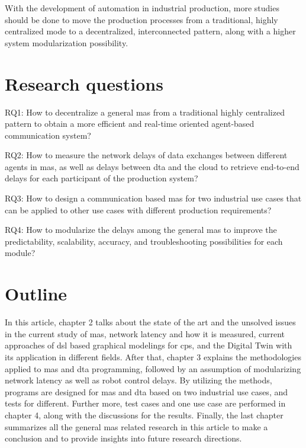 With the development of automation in industrial production, more studies 
should be done to move the production processes from a traditional, highly 
centralized mode to a decentralized, interconnected pattern, along with 
a higher system modularization possibility. 









\section{Research questions}
RQ1: How to decentralize a general \gls{mas} from a traditional highly 
centralized pattern to obtain a more efficient and real-time oriented agent-based 
communication system?

RQ2: How to measure the network delays of data exchanges between 
different agents in \gls{mas}, as well as delays between \gls{dta} and the cloud 
to retrieve end-to-end delays for each participant of the production system?

RQ3: How to design a communication based \gls{mas} for two industrial use 
cases that can be applied to other use cases with different production 
requirements? 

RQ4: How to modularize the delays among the general \gls{mas} to improve the 
predictability, scalability, accuracy, and troubleshooting possibilities for 
each module?  



\section{Outline}
In this article, chapter 2 talks about the state of the art and 
the unsolved issues in the current study of \gls{mas}, network 
latency and how it is measured, current approaches of \gls{dsl} 
based graphical modelings for \gls{cps}, and the Digital Twin with 
its application in different fields. After that, chapter 3 explains 
the methodologies applied to \gls{mas} and \gls{dta} programming, 
followed by an assumption of modularizing network latency as well 
as robot control delays. By utilizing the methods, programs are 
designed for \gls{mas} and \gls{dta} based on two industrial use cases, 
and tests for different. Further more, test cases and one use case are 
performed in chapter 4, along with 
the discussions for the results. Finally, the last chapter summarizes 
all the general \gls{mas} related research in this article to make a 
conclusion and to provide insights into future research directions.  
